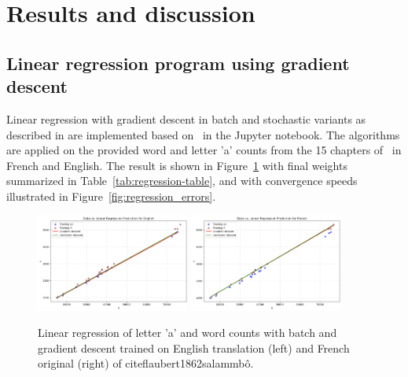 \documentclass[a4paper]{article}
\begin{document}
 
\section{Results and discussion}


\subsection{Linear regression program using gradient descent}

Linear regression with gradient descent in batch and stochastic variants as described in \cite[pp. 694--697]{aima} are implemented based on~\cite{nugues_lectures_2025} in the Jupyter notebook. The algorithms are applied on the provided word and letter 'a' counts from the 15 chapters of~\cite{flaubert1862salammbô} in French and English. The result is shown in Figure~\ref{fig:regression_English_French} with final weights  summarized in Table~\ref{tab:regression-table}, and with convergence speeds illustrated in Figure~\ref{fig:regression_errors}. 
\begin{figure}
    \centering
    \includegraphics[width=0.45\textwidth]{figures/Fit English.png}
    \includegraphics[width=0.45\textwidth]{figures/Fit French.png}
    \caption{Linear regression of letter 'a' and word counts with batch and gradient descent trained on English translation (left) and French original (right) of cite{flaubert1862salammbô}.}
    \label{fig:regression_English_French}
\end{figure}
\end{document}

